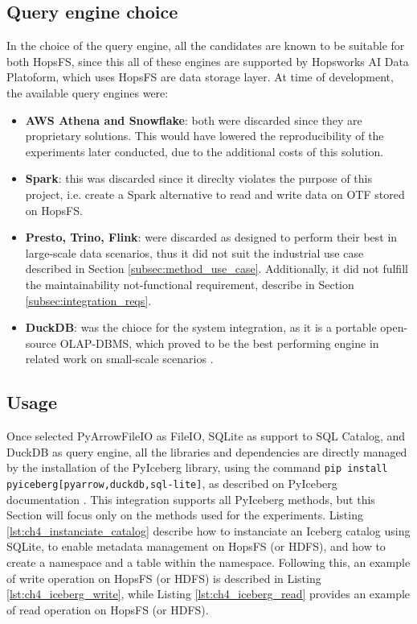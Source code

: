 \subsection{Query engine choice}
\label{subsec:integration_engine_choice}
In the choice of the query engine, all the candidates are known to be suitable for both \gls{HopsFS}, since this all of these engines are supported by Hopsworks AI Data Platoform, which uses HopsFS are data storage layer. At time of development, the available query engines were:
\begin{itemize}
    \item \textbf{\gls{AWS} Athena and Snowflake}: both were discarded since they are proprietary solutions. This would have lowered the reproducibility of the experiments later conducted, due to the additional costs of this solution.
    \item \textbf{Spark}: this was discarded since it direclty violates the purpose of this project, i.e. create a Spark alternative to read and write data on \gls{OTF} stored on \gls{HopsFS}.
    \item \textbf{Presto, Trino, Flink}: were discarded as designed to perform their best in large-scale data scenarios, thus it did not suit the  industrial use case described in Section \ref{subsec:method_use_case}. Additionally, it did not fulfill the maintainability not-functional requirement, describe in Section \ref{subsec:integration_reqs}.
    \item \textbf{DuckDB}: was the chioce for the system integration, as it is a portable open-source \gls{OLAP}-\gls{DBMS}, which proved to be the best performing engine in related work on small-scale scenarios \cite{raasveldtDuckDBEmbeddableAnalytical2019,Khazanchi1801362}.
\end{itemize}


\subsection{Usage}
\label{subsec:integration_usage}
Once selected PyArrowFileIO as FileIO, SQLite as support to SQL Catalog, and DuckDB as query engine, all the libraries and dependencies are directly managed by the installation of the PyIceberg library, using the command \verb|pip install pyiceberg[pyarrow,duckdb,sql-lite]|, as described on PyIceberg documentation \cite{iceberg_tech_docs}. This integration supports all PyIceberg methods, but this Section will focus only on the methods used for the experiments. Listing \ref{lst:ch4_instanciate_catalog} describe how to instanciate an Iceberg catalog using SQLite, to enable metadata management on \gls{HopsFS} (or \gls{HDFS}), and how to create a namespace and a table within the namespace. Following this, an example of write operation on \gls{HopsFS} (or \gls{HDFS}) is described in Listing \ref{lst:ch4_iceberg_write}, while Listing \ref{lst:ch4_iceberg_read} provides an example of read operation on \gls{HopsFS} (or \gls{HDFS}).


